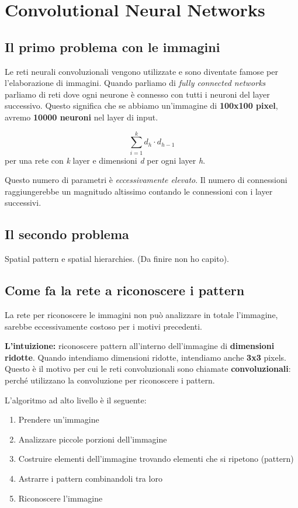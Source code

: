 \section{Convolutional Neural Networks}

\subsection{Il primo problema con le immagini}
Le reti neurali convoluzionali vengono utilizzate e sono diventate famose per
l'elaborazione di immagini. Quando parliamo di \textit{fully connected
    networks} parliamo di reti dove ogni neurone è connesso con tutti i neuroni del
layer successivo. Questo significa che se abbiamo un'immagine di
\textbf{100x100 pixel}, avremo \textbf{10000 neuroni} nel layer di input.

\begin{equation}
    \sum_{i=1}^{k} d_h \cdot d_{h-1}
\end{equation}
per una rete con \textit{k} layer e dimensioni \textit{d} per ogni layer \textit{h}.

Questo numero di parametri è \textit{eccessivamente elevato}. Il numero di
connessioni raggiungerebbe un magnitudo altissimo contando le connessioni con i
layer successivi.

\subsection{Il secondo problema}
Spatial pattern e spatial hierarchies. (Da finire non ho capito).

\subsection{Come fa la rete a riconoscere i pattern}

La rete per riconoscere le immagini non può analizzare in totale l'immagine,
sarebbe eccessivamente costoso per i motivi precedenti.

\textbf{L'intuizione:} riconoscere pattern all'interno dell'immagine di \textbf{dimensioni ridotte}. Quando intendiamo
dimensioni ridotte, intendiamo anche \textbf{3x3} pixels. Questo è il motivo per cui le reti convoluzionali
sono chiamate \textbf{convoluzionali}: perché utilizzano la convoluzione per riconoscere i pattern.

L'algoritmo ad alto livello è il seguente:
\begin{enumerate}
    \item Prendere un'immagine
    \item Analizzare piccole porzioni dell'immagine
    \item Costruire elementi dell'immagine trovando elementi che si ripetono (pattern)
    \item Astrarre i pattern combinandoli tra loro
    \item Riconoscere l'immagine
\end{enumerate}

